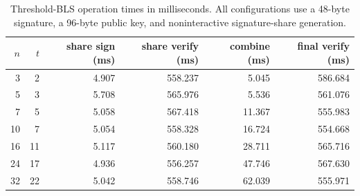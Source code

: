 \documentclass{article}
\begin{document}
\begin{table}[ht]
\centering
\small
\setlength{\tabcolsep}{5pt}
\begin{tabular}{rrrrrr}
\toprule
$n$ & $t$ & share sign (ms) & share verify (ms) & combine (ms) & final verify (ms) \\
\midrule
3  & 2  & 4.907 & 558.237 & 5.045  & 586.684 \\
5  & 3  & 5.708 & 565.976 & 5.536  & 561.076 \\
7  & 5  & 5.058 & 567.418 & 11.367 & 555.983 \\
10 & 7  & 5.054 & 558.328 & 16.724 & 554.668 \\
16 & 11 & 5.117 & 560.180 & 28.711 & 565.716 \\
24 & 17 & 4.936 & 556.257 & 47.746 & 567.630 \\
32 & 22 & 5.042 & 558.746 & 62.039 & 555.971 \\
\bottomrule
\end{tabular}
\caption{Threshold-BLS operation times in milliseconds. All configurations use
a 48-byte signature, a 96-byte public key, and noninteractive signature-share
generation.}
\label{tab:blsbench}
\end{table}
\end{document}
